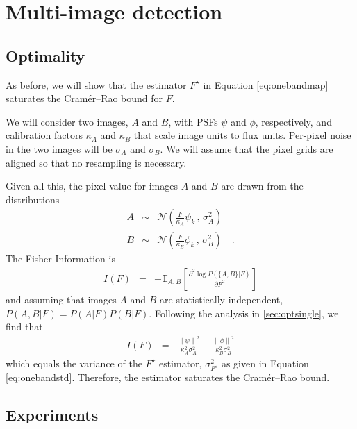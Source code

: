 \documentclass[11pt,letterpaper,linenumbers]{aastex63}
\newcommand{\drawnfrom}{\sim}
\newcommand{\gaussianN}{\mathcal{N}}
\newcommand{\gaussx}[2]{\gaussianN\!\left(#1 \, , \, #2\right)}
\newcommand{\norm}[1]{\left\lVert #1 \right\rVert}
\begin{document}
\section{Multi-image detection}
\label{app:multidet}

\subsection{Optimality}
\label{app:multiopt}
As before, we will show that the estimator $F^{\star}$ in
Equation \ref{eq:onebandmap} saturates the Cram\'er--Rao bound for $F$.

We will consider two images, $A$ and $B$, with PSFs $\psi$ and $\phi$,
respectively, and calibration factors $\kappa_A$ and $\kappa_B$ that
scale image units to flux units.  Per-pixel noise in the two images
will be $\sigma_A$ and $\sigma_B$.  We will assume that the pixel
grids are aligned so that no resampling is necessary.

Given all this, the pixel value for images $A$ and $B$ are drawn from
the distributions
\begin{eqnarray}
  A & \drawnfrom & \gaussx{\frac{F}{\kappa_A} \psi_k}{\sigma_A^2} \\
  B & \drawnfrom & \gaussx{\frac{F}{\kappa_B} \phi_k}{\sigma_B^2}
  \quad .
\end{eqnarray}
The Fisher Information is
\begin{eqnarray}
  I(F) &=& -\mathbb{E}_{A,B} \left[ \frac{\partial^2 \log P(\{ A,B \} | F)}{\partial F^2} \right]
\end{eqnarray}
and assuming that images $A$ and $B$ are statistically independent,
$P(A,B | F) = P(A|F) P(B|F)$.  Following the analysis in
\ref{sec:optsingle}, we find that
\begin{eqnarray}
  I(F) &=& \frac{\norm{\psi}^2}{\kappa_A^2 \sigma_A^2} +
  \frac{\norm{\phi}^2}{\kappa_B^2 \sigma_B^2}
\end{eqnarray}
which equals the variance of the $F^{\star}$ estimator,
$\sigma_{F^{\star}}^2$ as given in Equation \ref{eq:onebandstd}.
Therefore, the estimator saturates the Cram\'er--Rao bound.


\subsection{Experiments}
\end{document}
